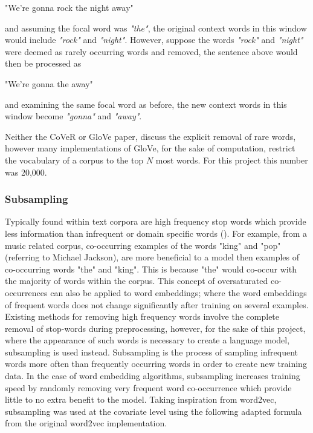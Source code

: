 \begin{center}
	"We're gonna rock the night away"
\end{center}

\noindent
and assuming the focal word was \textit{"the"}, the original context words in this window would include \textit{"rock"} and \textit{"night"}. However, suppose the words \textit{"rock"} and \textit{"night"} were deemed as rarely occurring words and removed, the sentence above would then be processed as 

\begin{center}
	"We're gonna the away"
\end{center}
\noindent
and examining the same focal word as before, the new context words in this window become \textit{"gonna"} and \textit{"away"}.

\noindent
\newline
Neither the CoVeR or GloVe paper, discuss the explicit removal of rare words, however many implementations of GloVe, for the sake of computation, restrict the vocabulary of a corpus to the top \(N\) most words. For this project this number was 20,000.
\subsubsection{Subsampling}
Typically found within text corpora are high frequency stop words which provide less information than infrequent or domain specific words (\cite{Mikolov2013a}). For example, from a music related corpus, co-occurring examples of the words "king" and "pop" (referring to Michael Jackson), are more beneficial to a model then examples of co-occurring words "the" and "king". This is because "the" would co-occur with the majority of words within the corpus. This concept of oversaturated co-occurrences can also be applied to word embeddings; where the word embeddings of frequent words does not change significantly after training on several examples.
Existing methods for removing high frequency words involve the complete removal of stop-words during preprocessing, however, for the sake of this project, where the appearance of such words is necessary to create a language model, subsampling is used instead. Subsampling is the process of sampling infrequent words more often than frequently occurring words in order to create new training data. In the case of word embedding algorithms, subsampling increases training speed by randomly removing very frequent word co-occurrence which provide little to no extra benefit to the model. Taking inspiration from word2vec, subsampling was used at the covariate level using the following adapted formula from the original word2vec implementation.

